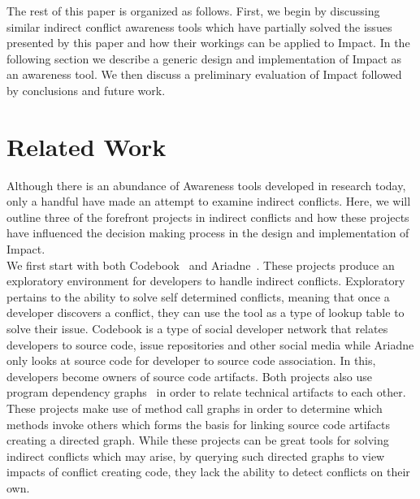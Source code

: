 \documentclass[conference]{IEEEtran}
\begin{document}
The rest of this paper is organized as follows. First, we begin by discussing
similar indirect conflict awareness tools which have partially solved the
issues presented by this paper and how their workings can be applied to 
Impact. In the following section we describe a generic design and implementation
of Impact as an awareness tool. We then discuss a preliminary evaluation of
Impact followed by conclusions and future work.\\


\section{Related Work}
Although there is an abundance of Awareness tools developed in research
today, only a handful have made an attempt to examine indirect conflicts.
Here, we will outline three of the forefront projects in indirect conflicts
and how these projects have influenced the decision making process in
the design and implementation of Impact.\\

We first start with both Codebook~\cite{Begel:2010:CDE} and 
Ariadne~\cite{Trainer:2005:BGT}. These projects produce an exploratory
environment for developers to handle indirect conflicts. Exploratory
pertains to the ability to solve self determined conflicts, meaning that
once a developer discovers a conflict, they can use the tool as a type of
lookup table to solve their issue. Codebook is a type of social developer
network that relates developers to source code, issue repositories and
other social media while Ariadne only looks at source code for developer
to source code association. In this, developers become
owners of source code artifacts. Both projects also use program 
dependency graphs~\cite{Horwitz:1992:UPD}
in order to relate technical artifacts to each other. These projects make 
use of method call graphs in order to 
determine which methods invoke others which forms the basis for 
linking source code artifacts creating a directed graph. While these 
projects can be great tools 
for solving indirect conflicts which may arise, by querying such directed
graphs to view impacts of conflict creating code, they lack the ability to
detect conflicts on their own.\\
\end{document}
